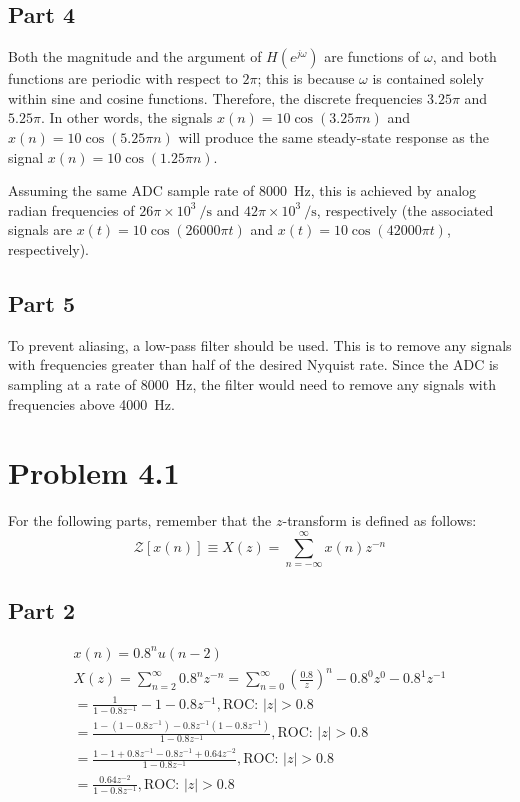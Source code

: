 \documentclass{article}
\begin{document}
\subsection*{Part 4}

Both the magnitude and the argument of \( H\left(e^{j\omega}\right) \)
are functions of \(\omega\), and both functions are periodic
with respect to \(2\pi\); this is because \(\omega\) is contained
solely within sine and cosine functions. Therefore, the discrete
frequencies \(3.25\pi\) and \(5.25\pi\). In other words, the
signals \(x(n) = 10\cos(3.25\pi n)\) and \(x(n) = 10\cos(5.25\pi n)\) will
produce the same steady-state response as the signal
\(x(n) = 10\cos(1.25\pi n)\).

Assuming the same ADC sample rate of \SI{8000}{\hertz}, this is
achieved by analog radian frequencies of
\(26\pi \times 10^3~\si{\per\second}\) and
\(42\pi \times 10^3~\si{\per\second}\), respectively (the associated
signals are \(x(t) = 10\cos(26000\pi t)\) and \(x(t) = 10\cos(42000\pi t)\),
respectively).

\subsection*{Part 5}

To prevent aliasing, a low-pass filter should be used. This is
to remove any signals with frequencies greater than half of the
desired Nyquist rate. Since the ADC is sampling at a rate of
\SI{8000}{\hertz}, the filter would need to remove any signals
with frequencies above \SI{4000}{\hertz}.

\section*{Problem 4.1}
For the following parts, remember that the \(z\)-transform is
defined as follows:
\begin{equation*}
    \mathcal{Z}[x(n)] \equiv X(z) = \sum_{n = -\infty}^\infty x(n)z^{-n}
\end{equation*}

\subsection*{Part 2}
\begin{gather*}
    x(n) = 0.8^n u(n - 2)\\
    X(z) = \sum_{n=2}^\infty 0.8^nz^{-n} = \sum_{n = 0}^\infty \left(\frac{0.8}{z}\right)^n - 0.8^0z^0 - 0.8^1z^{-1}\\
    = \frac{1}{1 - 0.8z^{-1}} - 1 - 0.8z^{-1}, \text{ROC: } |z|>0.8\\
    =\frac{1 - (1 - 0.8z^{-1}) - 0.8z^{-1}(1 - 0.8z^{-1})}{1 - 0.8z^{-1}}, \text{ROC: } |z|>0.8\\
    =\frac{1 - 1 + 0.8z^{-1} - 0.8z^{-1} + 0.64 z^{-2}}{1 - 0.8z^{-1}}, \text{ROC: } |z|>0.8\\
    =\frac{0.64z^{-2}}{1 - 0.8z^{-1}}, \text{ROC: } |z| > 0.8
\end{gather*}
\end{document}
